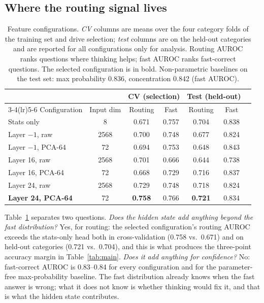 \documentclass{article}
\begin{document}
\subsection{Where the routing signal lives}
\label{sec:features}

\begin{table}[t]
\caption{Feature configurations. \emph{CV} columns are means over the four category folds of the training set and drive selection; \emph{test} columns are on the held-out categories and are reported for all configurations only for analysis. Routing AUROC ranks questions where thinking helps; fast AUROC ranks fast-correct questions. The selected configuration is in bold. Non-parametric baselines on the test set: max probability 0.836, concentration 0.842 (fast AUROC).}
\label{tab:features}
\centering
\small
\begin{tabular}{lcccccc}
\toprule
& & \multicolumn{2}{c}{CV (selection)} & \multicolumn{2}{c}{Test (held-out)} \\
\cmidrule(lr){3-4}\cmidrule(lr){5-6}
Configuration & Input dim & Routing & Fast & Routing & Fast \\
\midrule
Stats only & 8 & 0.671 & 0.757 & 0.704 & 0.838 \\
Layer $-1$, raw & 2568 & 0.700 & 0.748 & 0.677 & 0.824 \\
Layer $-1$, PCA-64 & 72 & 0.694 & 0.753 & 0.648 & 0.843 \\
Layer 16, raw & 2568 & 0.701 & 0.666 & 0.644 & 0.738 \\
Layer 16, PCA-64 & 72 & 0.668 & 0.729 & 0.716 & 0.837 \\
Layer 24, raw & 2568 & 0.729 & 0.748 & 0.718 & 0.824 \\
\textbf{Layer 24, PCA-64} & 72 & \textbf{0.758} & 0.766 & \textbf{0.721} & 0.834 \\
\bottomrule
\end{tabular}
\end{table}

Table~\ref{tab:features} separates two questions. \emph{Does the hidden state add anything beyond the fast distribution?} Yes, for routing: the selected configuration's routing AUROC exceeds the stats-only head both in cross-validation (0.758 vs.\ 0.671) and on held-out categories (0.721 vs.\ 0.704), and this is what produces the three-point accuracy margin in Table~\ref{tab:main}. \emph{Does it add anything for confidence?} No: fast-correct AUROC is 0.83--0.84 for every configuration and for the parameter-free max-probability baseline. The fast distribution already knows when the fast answer is wrong; what it does not know is whether thinking would fix it, and that is what the hidden state contributes.
\end{document}
